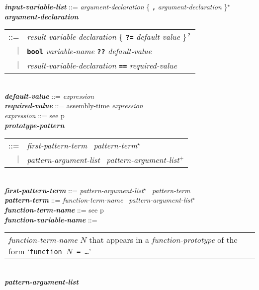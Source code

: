 \documentclass[12pt]{article}
\newcommand{\TT}[1]{{\tt \bfseries #1}}
\newcommand{\STAR}{{\Large $^\star$}}
\newcommand{\PLUS}[1][]{{$^{+#1}$}}
\newcommand{\QMARK}{{$^{\,\mbox{\footnotesize ?}}$}}
\newcommand{\emkey}[1]{{\em \bfseries #1}}
\newcommand{\pagref}[1]{p\pageref{#1}}
\newenvironment{indpar}[1][0.3in]%
	{\begin{list}{}%
		     {\setlength{\itemsep}{0in}%
		      \setlength{\topsep}{0in}%
		      \setlength{\parsep}{1ex}%
		      \setlength{\labelwidth}{#1}%
		      \setlength{\leftmargin}{#1}%
		      \addtolength{\leftmargin}{\labelsep}}%
	 \item}%
	{\end{list}}
\begin{document}
\begin{indpar}
\emkey{input-variable-list}
    ::= {\em argument-declaration}
                 \{ \TT{,} {\em argument-declaration} \}\STAR{}
\\[0.5ex]
\emkey{argument-declaration}\label{ARGUMENT-DECLARATION} \\
\hspace*{1in}\begin{tabular}[t]{@{}rl@{}}
    ::= & {\em result-variable-declaration}
          \{ \TT{?=} {\em default-value} \}\QMARK{} \\
    $|$ & \TT{bool} {\em variable-name}
          \TT{??} {\em default-value} \\
    $|$ & {\em result-variable-declaration}
          \TT{==} {\em required-value} \\
    \end{tabular}
\\[0.5ex]
\emkey{default-value} ::= {\em expression}
\\[0.5ex]
\emkey{required-value} ::= assembly-time {\em expression}
\\[0.5ex]
{\em expression} ::= see \pagref{EXPRESSION}
\\[0.5ex]
\emkey{prototype-pattern}\label{FUNCTION-PATTERN}
    \begin{tabular}[t]{rl}
    ::= & {\em first-pattern-term}~ {\em pattern-term}\STAR{} \\
    $|$ & {\em pattern-argument-list}~ {\em pattern-argument-list}\PLUS{}
    \end{tabular}
\\[0.5ex]
\emkey{first-pattern-term} ::= {\em pattern-argument-list}\STAR{}~
				{\em pattern-term}
\\[0.5ex]
\emkey{pattern-term}
    ::= {\em function-term-name}~ {\em pattern-argument-list}\STAR{}
\\[0.5ex]
\emkey{function-term-name} ::= see \pagref{FUNCTION-TERM-NAME}
\\[0.5ex]
\emkey{function-variable-name}\label{FUNCTION-VARIABLE-NAME} ::= \\
\hspace*{1in}
    \begin{tabular}[t]{@{}p{5in}@{}}
    {\em function-term-name} $N$ that appears in a {\em function-prototype}
    of the form `{\tt function $N$ = \ldots}'
    \end{tabular}
\\[0.5ex]
\emkey{pattern-argument-list} \\
\hspace*{1in}
    \begin{tabular}[t]{@{}rl}

\end{tabular}
\end{indpar}
\end{document}
